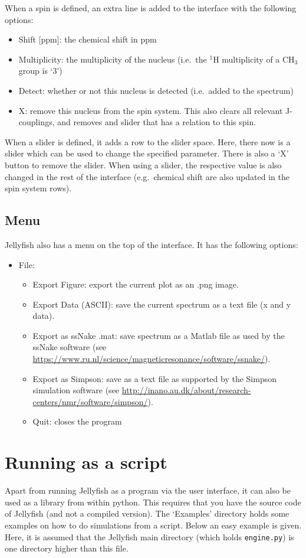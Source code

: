 \documentclass[11pt,a4paper]{article}
\begin{document}
When a spin is defined, an extra line is added to the interface with the following options:

\begin{itemize}
  \item Shift [ppm]: the chemical shift in ppm
  \item Multiplicity: the multiplicity of the nucleus (i.e.\ the $^1$H multiplicity of a CH$_3$ group is
	 `3')
  \item Detect: whether or not this nucleus is detected (i.e.\ added to the spectrum)
  \item X: remove this nucleus from the spin system. This also clears all relevant J-couplings, and
	 removes and slider that has a relation to this spin.
\end{itemize}
  
When a slider is defined, it adds a row to the slider space. Here, there now is a slider which can
be used to change the specified parameter. There is also a `X' button to remove the slider. When
using a slider, the respective value is also changed in the rest of the interface (e.g.\ chemical
shift are also updated in the spin system rows).


\subsection{Menu}
Jellyfish also has a menu on the top of the interface. It has the following options:

\begin{itemize}
  \item File:
\begin{itemize}
  \item Export Figure: export the current plot as an .png image.
  \item Export Data (ASCII): save the current spectrum as a text file (x and y data).
  \item Export as ssNake .mat: save spectrum as a Matlab file as used by the ssNake software (see
	 \url{https://www.ru.nl/science/magneticresonance/software/ssnake/}).
  \item Export as Simpson: save as a text file as supported by the Simpson simulation software
	 (see \url{http://inano.au.dk/about/research-centers/nmr/software/simpson/}).
  \item Quit: closes the program
\end{itemize}
\end{itemize}

\section{Running as a script}
Apart from running Jellyfish as a program via the user interface, it can also be used as a library
from within python. This requires that you have the source code of Jellyfish (and not a compiled
version). The `Examples' directory holds some examples on how to do simulations from a script. Below
an easy example is given. Here, it is assumed that the Jellyfish main directory (which holds
\texttt{engine.py}) is one directory higher than this file.
\end{document}
